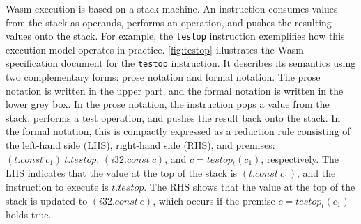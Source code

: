 Wasm execution is based on a stack machine.
An instruction consumes values from the stack as operands, performs an
operation, and pushes the resulting values onto the stack.
For example, the \texttt{testop} instruction exemplifies how this execution
model operates in practice.
\cref{fig:testop} illustrates the Wasm specification document for the
\texttt{testop} instruction.
It describes its semantics using two complementary forms: prose notation and
formal notation.
The prose notation is written in the upper part, and the formal notation is
written in the lower grey box.
In the prose notation, the instruction pops a value from the stack, performs a
test operation, and pushes the result back onto the stack.
In the formal notation, this is compactly expressed as a reduction rule
consisting of the left-hand side (LHS), right-hand side (RHS), and premises:
$(t.const ~ c_1) ~ t.testop$, $(i32.const ~ c)$, and $c = testop_t(c_1)$,
respectively.
The LHS indicates that the value at the top of the stack is $(t.const ~ c_1)$,
and the instruction to execute is $t.testop$.
The RHS shows that the value at the top of the stack is updated to $(i32.const
~ c)$, which occurs if the premise $c = testop_t(c_1)$ holds true.
